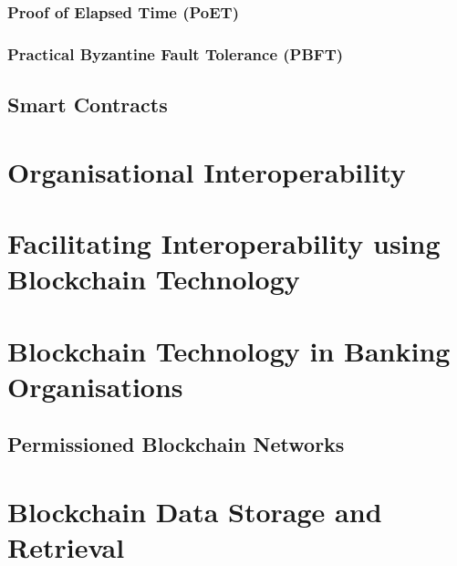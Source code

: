 \subsubsection{Proof of Elapsed Time (PoET)}

\subsubsection{Practical Byzantine Fault Tolerance (PBFT)}

\subsection{Smart Contracts}

\section{Organisational Interoperability}

\section{Facilitating Interoperability using Blockchain Technology}

\section{Blockchain Technology in Banking Organisations}

\subsection{Permissioned Blockchain Networks}

\section{Blockchain Data Storage and Retrieval}